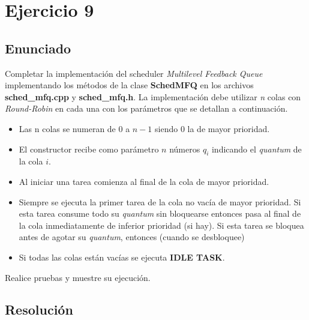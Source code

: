 \section{Ejercicio 9}

\subsection{Enunciado}
Completar la implementación del scheduler \textit{Multilevel Feedback Queue} implementando los métodos de la clase \textbf{SchedMFQ} en los archivos \textbf{sched\_mfq.cpp} y \textbf{sched\_mfq.h}.
La implementación debe utilizar \textit{n} colas con \textit{Round-Robin} en cada una con los parámetros que se detallan a continuación.

\begin{itemize}
\item Las n colas se numeran de 0 a $n-1$ siendo 0 la de mayor prioridad.

\item El constructor recibe como parámetro $n$ números $q_i$ indicando el \textit{quantum} de la cola $i$.

\item Al iniciar una tarea comienza al final de la cola de mayor prioridad.

\item Siempre se ejecuta la primer tarea de la cola no vacía de mayor prioridad. Si esta tarea consume todo su \textit{quantum} sin bloquearse entonces pasa al final de la cola inmediatamente de inferior prioridad (si hay). Si esta tarea se bloquea antes de agotar su \textit{quantum}, entonces (cuando se desbloquee)

\item Si todas las colas están vacías se ejecuta \textbf{IDLE TASK}.

\end{itemize}

Realice pruebas y muestre su ejecución.

\subsection{Resolución}